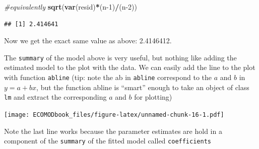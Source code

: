 \documentclass[
]{book}
\newenvironment{Shaded}{\begin{snugshade}}{\end{snugshade}}
\newcommand{\CommentTok}[1]{\textcolor[rgb]{0.56,0.35,0.01}{\textit{#1}}}
\newcommand{\DataTypeTok}[1]{\textcolor[rgb]{0.13,0.29,0.53}{#1}}
\newcommand{\DecValTok}[1]{\textcolor[rgb]{0.00,0.00,0.81}{#1}}
\newcommand{\FloatTok}[1]{\textcolor[rgb]{0.00,0.00,0.81}{#1}}
\newcommand{\KeywordTok}[1]{\textcolor[rgb]{0.13,0.29,0.53}{\textbf{#1}}}
\newcommand{\NormalTok}[1]{#1}
\newcommand{\OperatorTok}[1]{\textcolor[rgb]{0.81,0.36,0.00}{\textbf{#1}}}
\newcommand{\StringTok}[1]{\textcolor[rgb]{0.31,0.60,0.02}{#1}}
\begin{document}
\begin{Shaded}
\begin{Highlighting}[]
\CommentTok{#equivalently}
\KeywordTok{sqrt}\NormalTok{(}\KeywordTok{var}\NormalTok{(resid)}\OperatorTok{*}\NormalTok{(n}\DecValTok{-1}\NormalTok{)}\OperatorTok{/}\NormalTok{(n}\DecValTok{-2}\NormalTok{))}
\end{Highlighting}
\end{Shaded}

\begin{verbatim}
## [1] 2.414641
\end{verbatim}

Now we get the exact same value as above: 2.4146412.

The \texttt{summary} of the model above is very useful, but nothing like adding the estimated model to the plot with the data. We can easily add the line to the plot with function \texttt{abline} (tip: note the ab in \texttt{abline} correspond to the \(a\) and \(b\) in \(y=a+bx\), but the function abline is ``smart'' enough to take an object of class \texttt{lm} and extract the corresponding \(a\) and \(b\) for plotting)

\begin{Shaded}
\end{Shaded}

\texttt{[image: ECOMODbook\_files/figure-latex/unnamed-chunk-16-1.pdf]}

Note the last line works because the parameter estimates are hold in a component of the \texttt{summary} of the fitted model called \texttt{coefficients}
\end{document}
